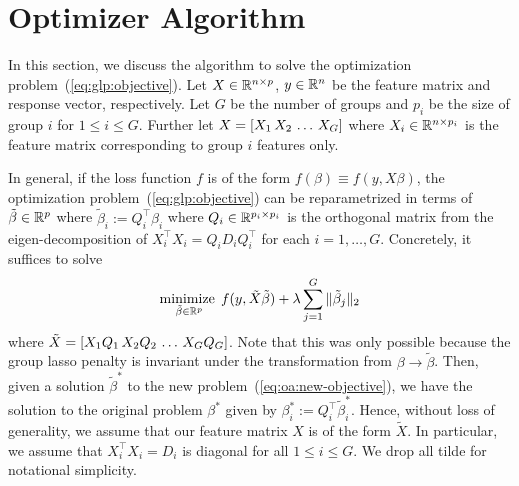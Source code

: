 \section{Optimizer Algorithm}\label{sec:optimizer}

In this section, we discuss the algorithm to solve the optimization problem~(\ref{eq:glp:objective}).
Let $X \in \mathbb{R}^{n\times p}$, $y\in \mathbb{R}^n$ be the feature matrix and response vector, respectively.
Let $G$ be the number of groups and $p_i$ be the size of group $i$ for $1\leq i\leq G$.
Further let $X = \left[X_1 \, X_2 \, \ldots \, X_G\right]$ where $X_i \in \mathbb{R}^{n \times p_i}$ is the feature matrix
corresponding to group $i$ features only.

In general, if the loss function $f$ is of the form $f(\beta) \equiv f(y, X\beta)$,
the optimization problem~(\ref{eq:glp:objective}) can be reparametrized
in terms of $\tilde{\beta} \in \mathbb{R}^p$ where $\tilde{\beta}_i := Q_i^\top \beta_i$
where $Q_i \in \mathbb{R}^{p_i \times p_i}$ is the orthogonal matrix from the eigen-decomposition of 
$X_i^\top X_i = Q_i D_i Q_i^\top$ for each $i=1,\ldots, G$.
Concretely, it suffices to solve
\begin{align}
    \operatorname*{minimize\;}_{\tilde{\beta} \in \mathbb{R}^p}
    f(y, \tilde{X} \tilde{\beta})
    + \lambda \sum\limits_{j=1}^G \|\tilde{\beta}_j\|_2
    \label{eq:oa:new-objective}
\end{align}
where $\tilde{X} = \left[X_1 Q_1 \, X_2 Q_2 \, \ldots \, X_G Q_G\right]$.
Note that this was only possible because the group lasso penalty is invariant under
the transformation from $\beta \to \tilde{\beta}$.
Then, given a solution $\tilde{\beta}^*$ to the new problem~(\ref{eq:oa:new-objective}),
we have the solution to the original problem $\beta^*$ given by
$\beta^*_i := Q_i^\top \tilde{\beta}_i^*$.
Hence, without loss of generality, we assume that 
our feature matrix $X$ is of the form $\tilde{X}$.
In particular, we assume that $X_i^\top X_i = D_i$ is diagonal for all $1\leq i\leq G$.
We drop all tilde for notational simplicity.

